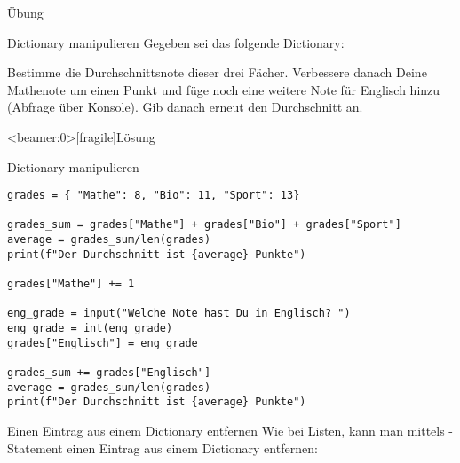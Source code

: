 \begin{frame}{Übung}

\begin{block}{Dictionary manipulieren}
	\vspace{2pt}
	Gegeben sei das folgende Dictionary: 
	
	
	Bestimme die Durchschnittsnote dieser drei Fächer. Verbessere danach Deine Mathenote um einen Punkt und füge noch eine weitere Note für Englisch hinzu (Abfrage über Konsole). Gib danach erneut den Durchschnitt an.  
\end{block}

\end{frame}


\begin{frame}<beamer:0>[fragile]{Lösung}

\begin{solutionblock}{Dictionary manipulieren}
\begin{verbatim}
grades = { "Mathe": 8, "Bio": 11, "Sport": 13}

grades_sum = grades["Mathe"] + grades["Bio"] + grades["Sport"]
average = grades_sum/len(grades)
print(f"Der Durchschnitt ist {average} Punkte")

grades["Mathe"] += 1

eng_grade = input("Welche Note hast Du in Englisch? ")
eng_grade = int(eng_grade)
grades["Englisch"] = eng_grade

grades_sum += grades["Englisch"]
average = grades_sum/len(grades)
print(f"Der Durchschnitt ist {average} Punkte")
\end{verbatim}
\end{solutionblock}
\end{frame}



\begin{frame}
\begin{block}{Einen Eintrag aus einem Dictionary entfernen}
\vspace{2pt}
Wie bei Listen, kann man mittels -Statement einen Eintrag aus einem Dictionary entfernen: 


\end{block}	



\end{frame}	

